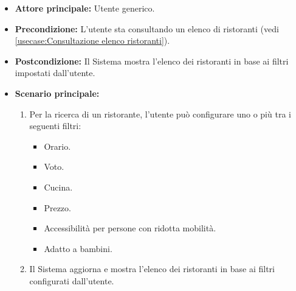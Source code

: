\label{usecase:Filtra ristoranti}
\begin{itemize}
	\item \textbf{Attore principale:} Utente generico.
	
	\item \textbf{Precondizione:} L'utente sta consultando un elenco di ristoranti (vedi \autoref{usecase:Consultazione elenco ristoranti}).

	\item \textbf{Postcondizione:} Il Sistema mostra l'elenco dei ristoranti in base ai filtri impostati dall'utente.
 
	      
	\item \textbf{Scenario principale:}
	      \begin{enumerate}
		      \item Per la ricerca di un ristorante, l'utente può configurare uno o più tra i seguenti filtri:
		      \begin{itemize}
                \item Orario.
                \item Voto.
                \item Cucina.
                \item Prezzo.
                \item Accessibilità per persone con ridotta mobilità.
                \item Adatto a bambini.
              \end{itemize}

		      \item Il Sistema aggiorna e mostra l'elenco dei ristoranti in base ai filtri configurati dall'utente.
	      \end{enumerate}

\end{itemize}